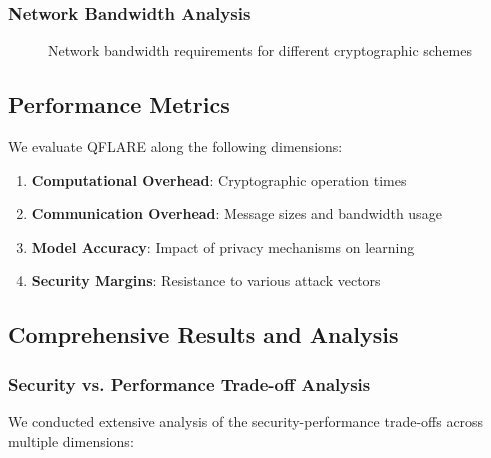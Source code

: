 \documentclass[journal,onecolumn]{IEEEtran}
\begin{document}
\subsubsection{Network Bandwidth Analysis}

\begin{figure}[h]
\centering
{}
\caption{Network bandwidth requirements for different cryptographic schemes}
\end{figure}

\subsection{Performance Metrics}

We evaluate QFLARE along the following dimensions:

\begin{enumerate}
\item \textbf{Computational Overhead}: Cryptographic operation times
\item \textbf{Communication Overhead}: Message sizes and bandwidth usage
\item \textbf{Model Accuracy}: Impact of privacy mechanisms on learning
\item \textbf{Security Margins}: Resistance to various attack vectors
\end{enumerate}

\subsection{Comprehensive Results and Analysis}

\subsubsection{Security vs. Performance Trade-off Analysis}

We conducted extensive analysis of the security-performance trade-offs across multiple dimensions:
\end{document}
